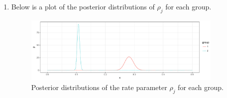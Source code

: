 \documentclass[12pt]{article}
\begin{document}
\begin{enumerate}[leftmargin=*]
\begin{enumerate}[leftmargin=1mm]
      \item Below is a plot of the posterior distributions of $\rho_j$ for each group.

        \begin{figure}[h!]
          \centering
          \includegraphics[width=0.9\textwidth]{./figures/exam02.pdf}
          \caption{Posterior distributions of the rate parameter $\rho_j$ for each group.}
          \label{fig:1}
        \end{figure}
    \end{enumerate}
\end{enumerate}
\end{document}
